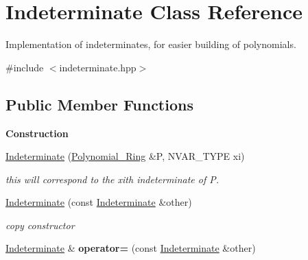 \hypertarget{class_indeterminate}{}\section{Indeterminate Class Reference}
\label{class_indeterminate}


Implementation of indeterminates, for easier building of polynomials.  




{\ttfamily \#include $<$indeterminate.\+hpp$>$}

\subsection*{Public Member Functions}
\begin{Indent}\textbf{ Construction}\par
\begin{DoxyCompactItemize}
\item 
\mbox{\label{class_indeterminate_a69cacbaf1f95b735ae1126de93f1da5c}} 
\hyperlink{class_indeterminate_a69cacbaf1f95b735ae1126de93f1da5c}{Indeterminate} (\hyperlink{class_polynomial___ring}{Polynomial\+\_\+\+Ring} \&P, N\+V\+A\+R\+\_\+\+T\+Y\+PE xi)
\begin{DoxyCompactList}\small\item\em {\ttfamily this} will correspond to the {\ttfamily xi}th indeterminate of {\ttfamily P}. \end{DoxyCompactList}\item 
\mbox{\label{class_indeterminate_affe3146cd68726d8a7f7cb1e70bc19fb}} 
\hyperlink{class_indeterminate_affe3146cd68726d8a7f7cb1e70bc19fb}{Indeterminate} (const \hyperlink{class_indeterminate}{Indeterminate} \&other)
\begin{DoxyCompactList}\small\item\em copy constructor \end{DoxyCompactList}\item 
\mbox{\label{class_indeterminate_ac2540ce0eecc8b82afd5d6742e27d6e4}} 
\hyperlink{class_indeterminate}{Indeterminate} \& {\bfseries operator=} (const \hyperlink{class_indeterminate}{Indeterminate} \&other)
\end{DoxyCompactItemize}
\end{Indent}
